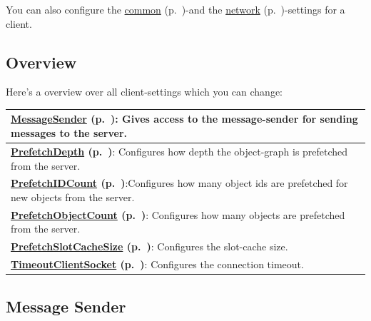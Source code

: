 You can also configure the \hyperref[ref:configuration-common-configuration]{common} (p.~\pageref{ref:configuration-common-configuration})-and the \hyperref[ref:configuration-network-configuration]{network} (p.~\pageref{ref:configuration-network-configuration})-settings for a client.

\subsection*{Overview}

Here's a overview over all client-settings which you can change:

{\small
\begin{longtable}{|p{}|}
\hline
\textbf{\hyperref[ref:configuration-client-message-sender]{MessageSender} (p.~\pageref{ref:configuration-client-message-sender})}: Gives access to the message-sender for sending messages to the server. \\ \hline
\textbf{\hyperref[ref:configuration-client-prefetch-depth]{PrefetchDepth} (p.~\pageref{ref:configuration-client-prefetch-depth})}: Configures how depth the object-graph is prefetched from the server. \\ \hline
\textbf{\hyperref[ref:configuration-client-prefecht-id-count]{PrefetchIDCount} (p.~\pageref{ref:configuration-client-prefecht-id-count})}:Configures how many object ids are prefetched for new objects from the server. \\ \hline
\textbf{\hyperref[ref:configuration-client-prefetch-object-count]{PrefetchObjectCount} (p.~\pageref{ref:configuration-client-prefetch-object-count})}: Configures how many objects are prefetched from the server. \\ \hline
\textbf{\hyperref[ref:configuration-client-prefetch-slot-cache-size]{PrefetchSlotCacheSize} (p.~\pageref{ref:configuration-client-prefetch-slot-cache-size})}: Configures the slot-cache size. \\ \hline
\textbf{\hyperref[ref:configuration-client-timeout-client-socket]{TimeoutClientSocket} (p.~\pageref{ref:configuration-client-timeout-client-socket})}: Configures the connection timeout. \\ \hline
\end{longtable}}

\subsection{Message Sender}
\label{ref:configuration-client-message-sender}

